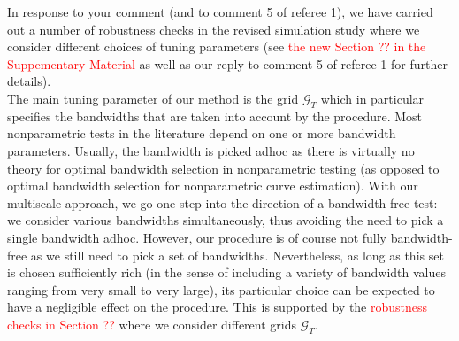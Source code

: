 \documentclass[a4paper,12pt]{article}
\begin{document}
\begin{enumerate}[label=\arabic*.,leftmargin=0.6cm]
In response to your comment (and to comment 5 of referee 1), we have carried out a number of robustness checks in the revised simulation study where we consider different choices of tuning parameters (see \textcolor{red}{the new Section ?? in the Suppementary Material} as well as our reply to comment 5 of referee 1 for further details). \\
The main tuning parameter of our method is the grid $\mathcal{G}_T$ which in particular specifies the bandwidths that are taken into account by the procedure.
Most nonparametric tests in the literature depend on one or more bandwidth parameters. Usually, the bandwidth is picked adhoc as there is virtually no theory for optimal bandwidth selection in nonparametric testing (as opposed to optimal bandwidth selection for nonparametric curve estimation). With our multiscale approach, we go one step into the direction of a bandwidth-free test: we consider various bandwidths simultaneously, thus avoiding the need to pick a single bandwidth adhoc. However, our procedure is of course not fully bandwidth-free as we still need to pick a set of bandwidths. Nevertheless, as long as this set is chosen sufficiently rich (in the sense of including a variety of bandwidth values ranging from very small to very large), its particular choice can be expected to have a negligible effect on the procedure. This is supported by the \textcolor{red}{robustness checks in Section ??} where we consider different grids $\mathcal{G}_T$. \\

\end{enumerate}
\end{document}
